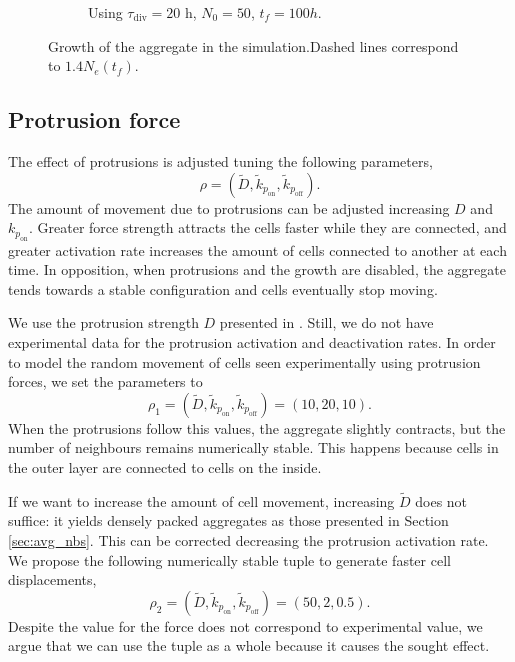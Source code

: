 \begin{figure}[ht]
\begin{subfigure}{0.4\textwidth}
        \caption{Using $\tau_\text{div}=20\text{ h}$, $N_0=50$, $t_f=100h$.}
    \end{subfigure}
    \caption{Growth of the aggregate in the simulation.\linebreak Dashed lines correspond to $1.4N_e(t_f)$.}
    \label{fig:growth}
\end{figure}


\subsection{Protrusion force}\label{sec:protrusion-force}

The effect of protrusions is adjusted tuning the following parameters, 
$$\rho=(\tilde D, \tilde k_{p_\text{on}}, \tilde k_{p_\text{off}}).$$
The amount of movement due to protrusions can be adjusted increasing $D$ and $k_{p_\text{on}}$. Greater force strength attracts the cells faster while they are connected, and greater activation rate increases the amount of cells connected to another at each time. In opposition, when protrusions and the growth are disabled, the aggregate tends towards a stable configuration and cells eventually stop moving.

We use the protrusion strength $D$ presented in \cite{Yusko_2014,Moore_2010}. Still, we do not have experimental data for the protrusion activation and deactivation rates. In order to model the random movement of cells seen experimentally using protrusion forces, we set the parameters to
\begin{equation}\label{eq:rho-1}
    \rho_1 = (\tilde D, \tilde k_{p_\text{on}}, \tilde k_{p_\text{off}}) = (10, 20, 10).
\end{equation} 
When the protrusions follow this values, the aggregate slightly contracts, but the number of neighbours remains numerically stable. This happens because cells in the outer layer are connected to cells on the inside.

If we want to increase the amount of cell movement, increasing $\tilde D$ does not suffice: it yields densely packed aggregates as those presented in Section \ref{sec:avg_nbs}. This can be corrected decreasing the protrusion activation rate. We propose the following numerically stable tuple to generate faster cell displacements,
\begin{equation}\label{eq:rho-2}
    \rho_2 = (\tilde D, \tilde k_{p_\text{on}}, \tilde k_{p_\text{off}}) = (50, 2, 0.5).
\end{equation}
Despite the value for the force does not correspond to experimental value, we argue that we can use the tuple as a whole because it causes the sought effect. 



